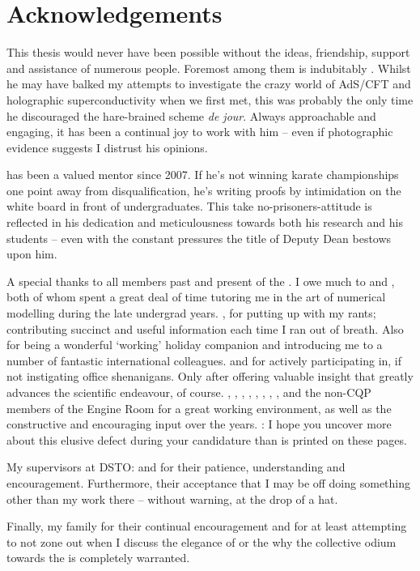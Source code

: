 \chapter{Acknowledgements}

\vspace{-1cm}

This thesis would never have been possible without the ideas, friendship, support and assistance of numerous people.
Foremost among them is indubitably .
Whilst he may have balked my attempts to investigate the crazy world of AdS/CFT and holographic superconductivity when we first met, this was probably the only time he discouraged the hare-brained scheme \emph{de jour}.
Always approachable and engaging, it has been a continual joy to work with him -- even if photographic evidence suggests I distrust his opinions.

 has been a valued mentor since 2007.
If he's not winning karate championships one point away from disqualification, he's writing proofs by intimidation on the white board in front of undergraduates.
This take no-prisoners-attitude is reflected in his dedication and meticulousness towards both his research and his students -- even with the constant pressures the title of Deputy Dean bestows upon him.

A special thanks to all members past and present of the .
I owe much to  and , both of whom spent a great deal of time tutoring me in the art of numerical modelling during the late undergrad years.
, for putting up with my rants; contributing succinct and useful information each time I ran out of breath.
Also for being a wonderful `working' holiday companion and introducing me to a number of fantastic international colleagues.
 and  for actively participating in, if not instigating office shenanigans.
Only after offering valuable insight that greatly advances the scientific endeavour, of course.
, , , , , , , ,  and the non-CQP members of the Engine Room for a great working environment, as well as the constructive and encouraging input over the years.
: I hope you uncover more about this elusive defect during your candidature than is printed on these pages.

My supervisors at DSTO: %
%
 and  for their patience, understanding and encouragement.
Furthermore, their acceptance that I may be off doing something other than my work there -- without warning, at the drop of a hat.

Finally, my family for their continual encouragement and for at least attempting to not zone out when I discuss the elegance of  or the why the collective odium towards the  is completely warranted.


